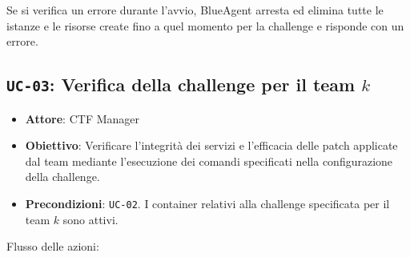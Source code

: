 Se si verifica un errore durante l'avvio, BlueAgent arresta ed elimina
tutte le istanze e le risorse create fino a quel momento per la
challenge e risponde con un errore.

\subsection{\texorpdfstring{\texttt{UC-03}: Verifica della challenge per
il team
\(k\)}{UC-03: Verifica della challenge per il team k}}\label{uc-03-verifica-della-challenge-per-il-team-k}

\begin{itemize}
\tightlist
\item
  \textbf{Attore}: CTF Manager
\item
  \textbf{Obiettivo}: Verificare l'integrità dei servizi e l'efficacia
  delle patch applicate dal team mediante l'esecuzione dei comandi
  specificati nella configurazione della challenge.
\item
  \textbf{Precondizioni}: \passthrough{\lstinline!UC-02!}. I container
  relativi alla challenge specificata per il team \(k\) sono attivi.
\end{itemize}

Flusso delle azioni:

